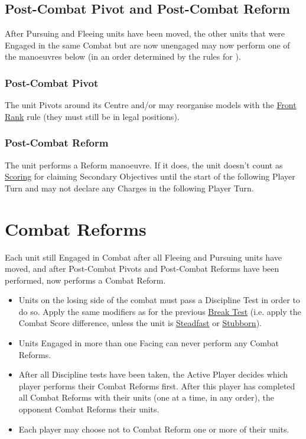 {\subsection{Post-Combat Pivot and Post-Combat Reform}
\label{post_combat_pivot_and_post_combat_reform}

After Pursuing and Fleeing units have been moved, the other units that were Engaged in the same Combat but are now unengaged may now perform one of the manoeuvres below (in an order determined by the rules for ).

\subsubsection{Post-Combat Pivot}
\label{post_combat_pivot}

The unit Pivots around its Centre and/or may reorganise models with the \hyperref[front_rank]{Front Rank} rule (they must still be in legal positions).

\subsubsection{Post-Combat Reform}
\label{post_combat_reform}

The unit performs a Reform manoeuvre. If it does, the unit doesn't count as \hyperref[scoring]{Scoring} for claiming Secondary Objectives until the start of the following Player Turn and may not declare any Charges in the following Player Turn.

\clearpage
\section{Combat Reforms}
\label{combat_reform}

Each unit still Engaged in Combat after all Fleeing and Pursuing units have moved, and after Post-Combat Pivots and Post-Combat Reforms have been performed, now performs a Combat Reform.

\begin{itemize}
\item Units on the losing side of the combat must pass a Discipline Test in order to do so. Apply the same modifiers as for the previous \hyperref[break_test]{Break Test} (i.e. apply the Combat Score difference, unless the unit is \hyperref[steadfast]{Steadfast} or \hyperref[stubborn]{Stubborn}).
\item Units Engaged in more than one Facing can never perform any Combat Reforms.
\item After all Discipline tests have been taken, the Active Player decides which player performs their Combat Reforms first. After this player has completed all Combat Reforms with their units (one at a time, in any order), the opponent Combat Reforms their units.
\item Each player may choose not to Combat Reform one or more of their units.
\end{itemize}

}
